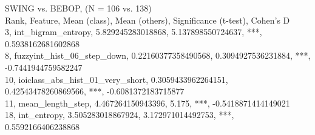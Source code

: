 SWING vs. BEBOP, (N = 106 vs. 138)\\
Rank, Feature, Mean (class), Mean (others), Significance (t-test), Cohen's D\\
3, int_bigram_entropy, 5.829245283018868, 5.137898550724637, ***, 0.5938162681602868\\
8, fuzzyint_hist_06_step_down, 0.22160377358490568, 0.3094927536231884, ***, -0.7441944759582247\\
10, ioiclass_abs_hist_01_very_short, 0.3059433962264151, 0.42543478260869566, ***, -0.6081372183715877\\
11, mean_length_step, 4.467264150943396, 5.175, ***, -0.5418871414149021\\
18, int_entropy, 3.505283018867924, 3.172971014492753, ***, 0.5592166406238868\\
